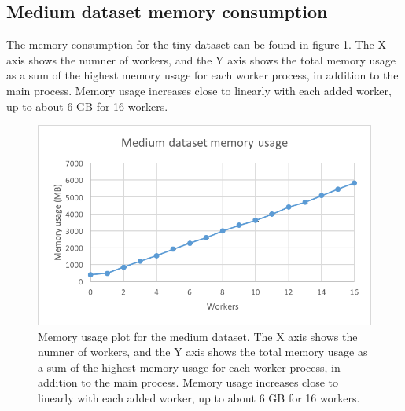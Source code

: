 \subsection{Medium dataset memory consumption}
The memory consumption for the tiny dataset can be found in figure \ref{fig:dataset_3_memory}.
The X axis shows the numner of workers, and the Y axis shows the total memory usage as
a sum of the highest memory usage for each worker process, in addition to the main process. Memory usage increases close to linearly with each added worker,
up to about 6 GB for 16 workers.
\begin{figure}[ht]
  \centering
  \includegraphics[width=120mm]{figures/dataset_3/dataset_3_memory.png}
  \caption[Memory usage plot for the medium dataset.]{Memory usage plot for the medium dataset. The X axis shows the numner of workers, and the Y axis shows the total memory usage as
  a sum of the highest memory usage for each worker process, in addition to the main process. Memory usage increases close to linearly with each added worker,
  up to about 6 GB for 16 workers.}
  \label{fig:dataset_3_memory}
\end{figure}

